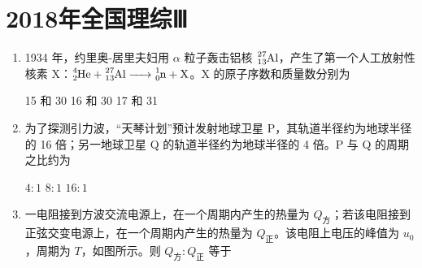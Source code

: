 \documentclass[\gkver]{gaokaozhenti}
\begin{document}
\chapter{2018年全国理综Ⅲ}

\begin{enumerate}
\item
1934 年，约里奥-居里夫妇用 $\alpha$ 粒子轰击铝核 $\ce{^{27}_{13}Al}$，产生了第一个人工放射性核素 X：$\ce{^{4}_{2}He + ^{27}_{13}Al -> ^{1}_{0}n + X}$。X 的原子序数和质量数分别为

{15 和 30}
{16 和 30}
{17 和 31}


\item
为了探测引力波，“天琴计划”预计发射地球卫星 P，其轨道半径约为地球半径的 16 倍；另一地球卫星 Q 的轨道半径约为地球半径的 4 倍。P 与 Q 的周期之比约为

{$4:1$}
{$8:1$}
{$16:1$}


\item
一电阻接到方波交流电源上，在一个周期内产生的热量为 $Q_{\text{方}}$；若该电阻接到正弦交变电源上，在一个周期内产生的热量为 $Q_{\text{正}}$。该电阻上电压的峰值为 $u_{0}$，周期为 $T$，如图所示。则 $Q_{\text{方}}:Q_{\text{正}}$ 等于


\end{enumerate}
\end{document}
